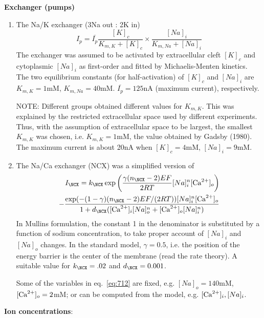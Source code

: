 {\bf Exchanger (pumps)}
\begin{enumerate}
\item The Na/K exchanger (3Na out : 2K in)
  \begin{equation}
    \label{eq:708}
    I_p = \overline{I_p} \frac{[K]_c}{K_{m,K}+[K]_c} \times 
    \frac{[Na]_i}{K_{m,Na}+[Na]_i}
  \end{equation}
  The exchanger was assumed to be activated by extracellular cleft $[K]_c$
  and cytoplasmic $[Na]_i$ as first-order and fitted by
  Michaelis-Menten kinetics. The two equilibrium constants (for
  half-activation) of $[K]_c$ and $[Na]_i$ are $K_{m,K}=1$mM,
  $K_{m,Na}=40$mM. $\overline{I_p}=125$nA (maximum current), respectively.

  NOTE: Different groups obtained different values for $K_{m,K}$. This
  was explained by the restricted extracellular space used by
  different experiments. Thus, with the assumption of extracellular
  space to be largest, the smallest $K_{m,K}$ was chosen,
  i.e. $K_{m,K}= 1$mM, the value obtained by Gadsby (1980).  The
  maximum current is about 20nA when $[K]_c=4$mM, $[Na]_i=9$mM.

\item The Na/Ca exchanger (NCX) was a simplified version
  of~\citep{mullins1977mnc}
  \begin{equation}
    \label{eq:712}
    \begin{split}
      I_\NCX =
      k_\NCX\exp\left(\frac{\gamma(n_\NCX-2)EF}{2RT}[Na]_i^n[\Ca]_o\right) \\
      -\frac{\exp(-(1-\gamma)(n_\NCX-2)EF/(2RT))[Na]_i^n[\Ca]_o}{1+d_\NCX([\Ca]_i[Na]_o^n
        + [\Ca]_o[Na]_i^n)}
    \end{split}
  \end{equation}
  In Mullins formulation, the constant 1 in the denominator is
  substituted by a function of sodium concentration, to take proper
  account of $[Na]_i$ and $[Na]_o$ changes. In the standard model,
  $\gamma=0.5$, i.e. the position of the energy barrier is the center
  of the membrane (read the rate theory). A suitable value for
  $k_\NCX=.02$ and $d_\NCX=0.001$.

  Some of the variables in eq.~\eqref{eq:712} are fixed,
  e.g. $[Na]_o=140$mM, $[{\text{Ca}^{2+}}]_o = 2$mM; or can be computed from the
  model, e.g. $[{\text{Ca}^{2+}}]_i, [Na]_i$. 

\end{enumerate}

{\bf Ion concentrations}: 


